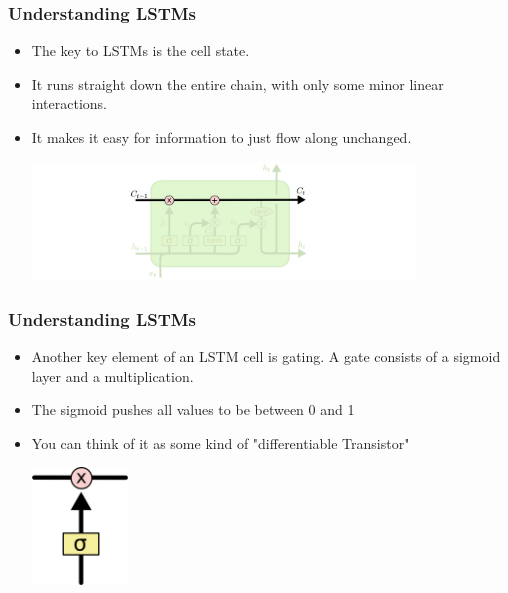 \documentclass{beamer}
\begin{document}
\begin{frame}[fragile]
\frametitle{Understanding LSTMs}
  \begin{itemize}
	\item The key to LSTMs is the cell state.
	\item It runs straight down the entire chain, with only some minor linear interactions.
	\item It makes it easy for information to just flow along unchanged.
\begin{center}
	\includegraphics[width=0.8\textwidth]{05_LSTM3-C-line}
\end{center}
  \end{itemize}
\end{frame}

\begin{frame}[fragile]
\frametitle{Understanding LSTMs}
  \begin{itemize}
	\item Another key element of an LSTM cell is gating. A gate consists of a sigmoid layer and a multiplication.
	\item The sigmoid pushes all values to be between 0 and 1
	\item You can think of it as some kind of "differentiable Transistor"
\begin{center}
	\includegraphics[width=0.2\textwidth]{05_LSTM3-gate}
\end{center}
  \end{itemize}
\end{frame}
\end{document}
